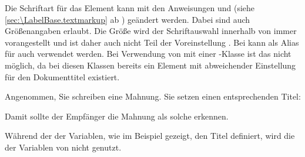 %
%
Die Schriftart für das Element %
 kann mit den Anweisungen
 und
 (siehe
\autoref{sec:\LabelBase.textmarkup} ab
) geändert werden. Dabei sind auch
Größenangaben erlaubt. Die Größe  wird der Schriftauswahl
innerhalb von \KOMAScript{} immer vorangestellt und ist daher auch nicht
Teil der Voreinstellung
. Bei
 kann als Alias für
 auch
 verwendet werden. Bei
Verwendung von  mit einer \KOMAScript-Klasse ist das
nicht möglich, da bei diesen Klassen bereits ein Element
 mit abweichender Einstellung für den Dokumenttitel
existiert.%
%
%
\begin{Example}
  Angenommen, Sie schreiben eine Mahnung. Sie setzen einen
  entsprechenden Titel:
\begin{lstcode}
\end{lstcode}
  Damit sollte der Empfänger die Mahnung als solche erkennen.
\end{Example}
Während der  der Variablen, wie im Beispiel gezeigt, den Titel
definiert, wird die  der Variablen  von
\KOMAScript{} nicht genutzt.
%
\EndIndexGroup


